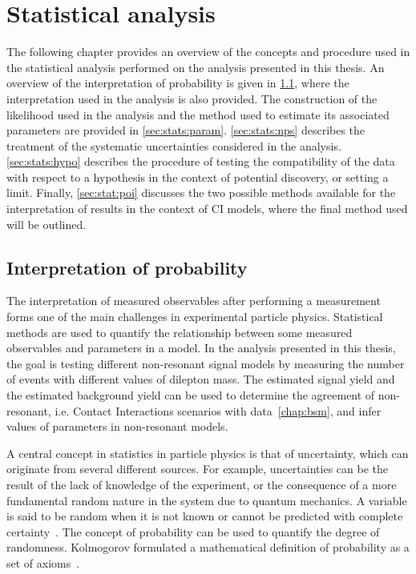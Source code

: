 \chapter{Statistical analysis}\label{chap:stats}
The following chapter provides an overview of the concepts and procedure used in the statistical analysis performed on the analysis presented in this thesis. An overview of the interpretation of probability is given in \cref{sec:stats:interp}, where the interpretation used in the analysis is also provided. The construction of the likelihood used in the analysis and the method used to estimate its associated parameters are provided in \cref{sec:stats:param}. \cref{sec:stats:nps} describes the treatment of the systematic uncertainties considered in the analysis. \cref{sec:stats:hypo} describes the procedure of testing the compatibility of the data with respect to a hypothesis in the context of potential discovery, or setting a limit. Finally, \cref{sec:stat:poi} discusses the two possible methods available for the interpretation of results in the context of CI models, where the final method used will be outlined.

\section{Interpretation of probability}\label{sec:stats:interp}
The interpretation of measured observables after performing a measurement forms one of the main challenges in experimental particle physics. Statistical methods are used to quantify the relationship between some measured observables and parameters in a model. In the analysis presented in this thesis, the goal is testing different non-resonant signal models by measuring the number of events with different values of dilepton mass. The estimated signal yield and the estimated background yield can be used to determine the agreement of non-resonant, i.e. Contact Interactions scenarios with data~\cref{chap:bsm}, and infer values of parameters in non-resonant models. 

A central concept in statistics in particle physics is that of uncertainty, which can originate from several different sources. For example, uncertainties can be the result of the lack of knowledge of the experiment, or the consequence of a more fundamental random nature in the system due to quantum mechanics. A variable is said to be random when it is not known or cannot be predicted with complete certainty~\cite{Cowan1998}. The concept of probability can be used to quantify the degree of randomness. Kolmogorov formulated a mathematical definition of probability as a set of axioms~\cite{Kol33}. 


